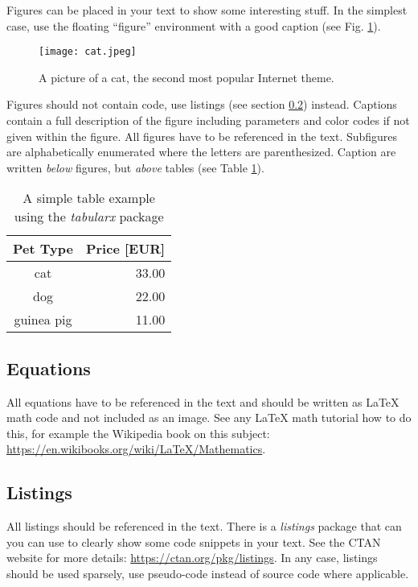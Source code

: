   Figures can be placed in your text to show some interesting stuff. In the simplest case, use the floating ``figure'' environment with a good caption (see Fig. \ref{fig:example}).

  \begin{figure}
		\centering
		\texttt{[image: cat.jpeg]}
      \caption{A picture of a cat, the second most popular Internet theme.}
		\label{fig:example}
  \end{figure}

  Figures should not contain code, use listings (see section \ref{subsec:listings}) instead. Captions contain a full description of the figure including parameters and color codes if not given within the figure. All figures have to be referenced in the text. Subfigures are alphabetically enumerated where the letters are parenthesized.  Caption are written \textit{below} figures, but \textit{above} tables (see Table \ref{tab:example}).

  \begin{table}
	  \centering
	  \caption{A simple table example using the \textit{tabularx} package}
	  \begin{tabularx}{0.4\textwidth}{cr}
		  \textbf{Pet Type} & \textbf{Price [EUR]}\\
		  \hline
		  cat & 33.00 \\
		  dog & 22.00 \\
		  guinea pig & 11.00 \\
		  \hline
	  \end{tabularx}
	  \label{tab:example}
  \end{table}

  \subsection{Equations}
  All equations have to be referenced in the text and should be written as LaTeX math code and not included as an image. See any LaTeX math tutorial how to do this, for example the Wikipedia book on this subject: \url{https://en.wikibooks.org/wiki/LaTeX/Mathematics}.

  \subsection{Listings}
  \label{subsec:listings}

	All listings should be referenced in the text. There is a \textit{listings} package that can you can use to clearly show some code snippets in your text. See the CTAN website for more details: \url{https://ctan.org/pkg/listings}. In any case, listings should be used sparsely, use pseudo-code instead of source code where applicable.

